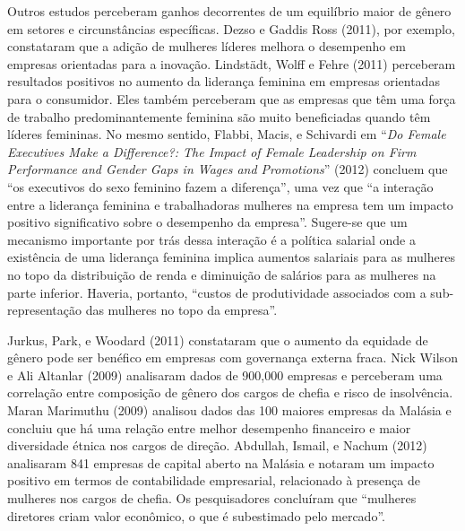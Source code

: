 Outros estudos perceberam ganhos decorrentes de um equilíbrio maior de
gênero em setores e circunstâncias específicas. Dezso e Gaddis Ross
(2011), por exemplo, constataram que a adição de mulheres líderes
melhora o desempenho em empresas orientadas para a inovação. Lindstädt,
Wolff e Fehre (2011) perceberam resultados positivos no aumento da
liderança feminina em empresas orientadas para o consumidor. Eles também
perceberam que as empresas que têm uma força de trabalho
predominantemente feminina são muito beneficiadas quando têm líderes
femininas. No mesmo sentido, Flabbi, Macis, e Schivardi em ``\emph{Do
Female Executives Make a Difference?: The Impact of Female Leadership on
Firm Performance and Gender Gaps in Wages and Promotions}'' (2012)
concluem que ``os executivos do sexo feminino fazem a diferença'', uma
vez que ``a interação entre a liderança feminina e trabalhadoras
mulheres na empresa tem um impacto positivo significativo sobre o
desempenho da empresa''. Sugere-se que um mecanismo importante por trás
dessa interação é a política salarial onde a existência de uma liderança
feminina implica aumentos salariais para as mulheres no topo da
distribuição de renda e diminuição de salários para as mulheres na parte
inferior. Haveria, portanto, ``custos de produtividade associados com a
sub-representação das mulheres no topo da empresa''.

Jurkus, Park, e Woodard (2011) constataram que o aumento da equidade de
gênero pode ser benéfico em empresas com governança externa fraca. Nick
Wilson e Ali Altanlar (2009) analisaram dados de 900,000 empresas e
perceberam uma correlação entre composição de gênero dos cargos de
chefia e risco de insolvência. Maran Marimuthu (2009) analisou dados das
100 maiores empresas da Malásia e concluiu que há uma relação entre
melhor desempenho financeiro e maior diversidade étnica nos cargos de
direção. Abdullah, Ismail, e Nachum (2012) analisaram 841 empresas de
capital aberto na Malásia e notaram um impacto positivo em termos de
contabilidade empresarial, relacionado à presença de mulheres nos cargos
de chefia. Os pesquisadores concluíram que ``mulheres diretores criam
valor econômico, o que é subestimado pelo mercado''.

